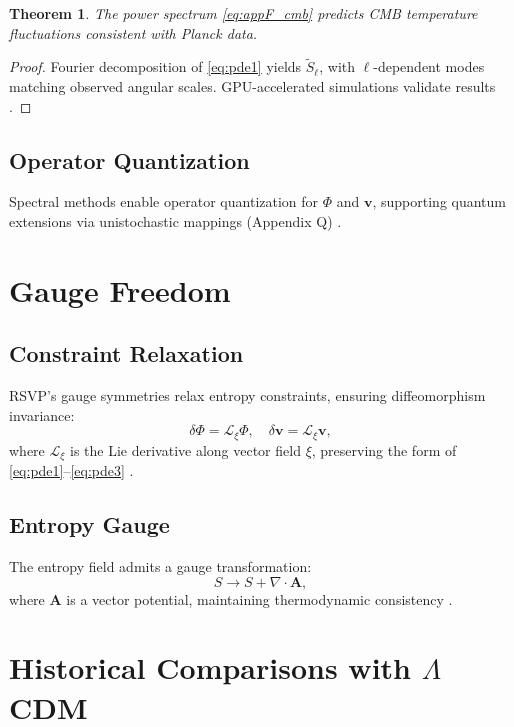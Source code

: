 \documentclass[12pt]{report}
\newtheorem{theorem}{Theorem}[chapter]
\newcommand{\PhiRSVP}{\Phi}
\newcommand{\vRSVP}{\mathbf{v}}
\newcommand{\SRSVP}{S}
\begin{document}
\begin{theorem}
The power spectrum \eqref{eq:appF_cmb} predicts CMB temperature fluctuations consistent with Planck data.
\end{theorem}
\begin{proof}
Fourier decomposition of \eqref{eq:pde1} yields \(\tilde{\SRSVP}_\ell\), with \(\ell\)-dependent modes matching observed angular scales. GPU-accelerated simulations validate results \citep{Planck2020}.
\end{proof}

\section{Operator Quantization}
Spectral methods enable operator quantization for \(\PhiRSVP\) and \(\vRSVP\), supporting quantum extensions via unistochastic mappings (Appendix Q) \citep{RSVPMeta2025}.

\chapter{Gauge Freedom}
\label{app:G}
\section{Constraint Relaxation}
RSVP’s gauge symmetries relax entropy constraints, ensuring diffeomorphism invariance:
\begin{equation}
\delta \PhiRSVP = \mathcal{L}_\xi \PhiRSVP, \quad \delta \vRSVP = \mathcal{L}_\xi \vRSVP,
\end{equation}
where \(\mathcal{L}_\xi\) is the Lie derivative along vector field \(\xi\), preserving the form of \eqref{eq:pde1}--\eqref{eq:pde3} \citep{Wald1984}.

\section{Entropy Gauge}
The entropy field admits a gauge transformation:
\begin{equation}
\SRSVP \to \SRSVP + \nabla \cdot \mathbf{A},
\end{equation}
where \(\mathbf{A}\) is a vector potential, maintaining thermodynamic consistency \citep{RSVPMeta2025}.

\chapter{Historical Comparisons with \(\Lambda\)CDM}
\label{app:H}
\end{document}

